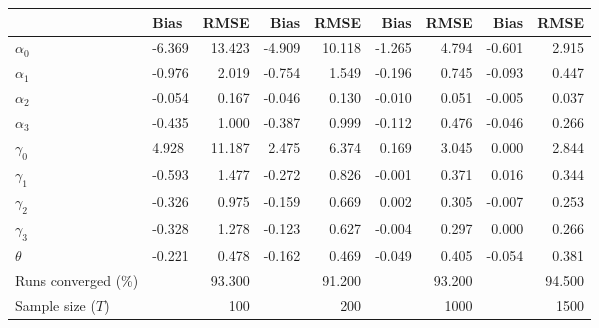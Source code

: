 
\begin{tabular}[t]{llrrrrrrr}
\toprule
  & Bias & RMSE & Bias & RMSE & Bias & RMSE & Bias & RMSE\\
\midrule
$\alpha_{0}$ & -6.369 & 13.423 & -4.909 & 10.118 & -1.265 & 4.794 & -0.601 & 2.915\\
$\alpha_{1}$ & -0.976 & 2.019 & -0.754 & 1.549 & -0.196 & 0.745 & -0.093 & 0.447\\
$\alpha_{2}$ & -0.054 & 0.167 & -0.046 & 0.130 & -0.010 & 0.051 & -0.005 & 0.037\\
$\alpha_{3}$ & -0.435 & 1.000 & -0.387 & 0.999 & -0.112 & 0.476 & -0.046 & 0.266\\
$\gamma_{0}$ & 4.928 & 11.187 & 2.475 & 6.374 & 0.169 & 3.045 & 0.000 & 2.844\\
$\gamma_{1}$ & -0.593 & 1.477 & -0.272 & 0.826 & -0.001 & 0.371 & 0.016 & 0.344\\
$\gamma_{2}$ & -0.326 & 0.975 & -0.159 & 0.669 & 0.002 & 0.305 & -0.007 & 0.253\\
$\gamma_{3}$ & -0.328 & 1.278 & -0.123 & 0.627 & -0.004 & 0.297 & 0.000 & 0.266\\
$\theta$ & -0.221 & 0.478 & -0.162 & 0.469 & -0.049 & 0.405 & -0.054 & 0.381\\
Runs converged (\%) &  & 93.300 &  & 91.200 &  & 93.200 &  & 94.500\\
Sample size ($T$) &  & 100 &  & 200 &  & 1000 &  & 1500\\
\bottomrule
\end{tabular}
